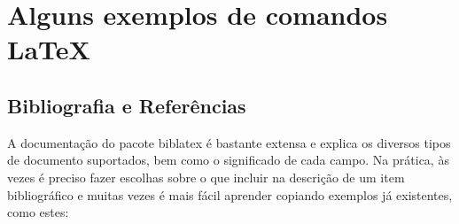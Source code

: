 \chapter{Alguns exemplos de comandos \LaTeX{}}

\section{Bibliografia e Referências}

A documentação do pacote biblatex é bastante extensa e explica
os diversos tipos de documento suportados, bem como o significado
de cada campo. Na prática, às vezes é preciso fazer escolhas sobre
o que incluir na descrição de um item bibliográfico e muitas vezes
é mais fácil aprender copiando exemplos já existentes, como estes:

